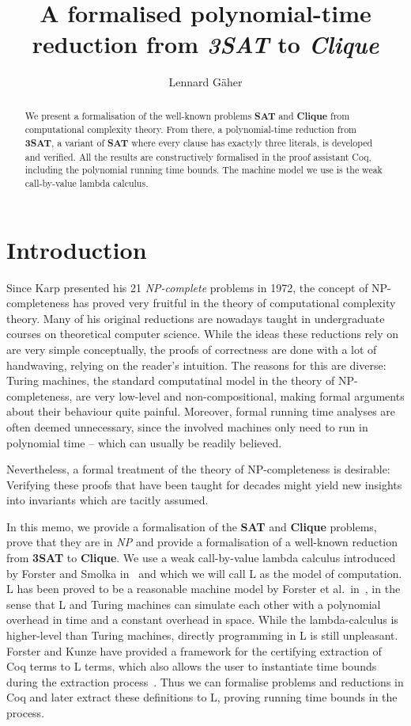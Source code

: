 \documentclass[a4paper,UKenglish,cleveref, autoref]{lipics-v2019}
\title{A formalised polynomial-time reduction from \emph{3SAT} to \emph{Clique}} %
\author{Lennard Gäher}{Saarland University, Germany}{s8legaeh@stud.uni-saarland.de}{}{}%
\begin{document}
\maketitle

\begin{abstract}
  We present a formalisation of the well-known problems \textbf{SAT} and \textbf{Clique} from computational complexity theory. From there, a polynomial-time reduction from \textbf{3SAT}, a variant of \textbf{SAT} where every clause has exactyly three literals, is developed and verified. 
  All the results are constructively formalised in the proof assistant Coq, including the polynomial running time bounds. The machine model we use is the weak call-by-value lambda calculus. 
\end{abstract}

\section{Introduction}
Since Karp presented his 21 \emph{NP-complete} problems in 1972, the concept of NP-completeness has proved very fruitful in the theory of computational complexity theory. Many of his original reductions are nowadays taught in undergraduate courses on theoretical computer science. 
While the ideas these reductions rely on are very simple conceptually, the proofs of correctness are done with a lot of handwaving, relying on the reader's intuition. The reasons for this are diverse: Turing machines, the standard computatinal model in the theory of NP-completeness, are very low-level and non-compositional, making formal arguments about their behaviour quite painful. Moreover, formal running time analyses are often deemed unnecessary, since the involved machines only need to run in polynomial time -- which can usually be readily believed.

Nevertheless, a formal treatment of the theory of NP-completeness is desirable: Verifying these proofs that have been taught for decades might yield new insights into invariants which are tacitly assumed.

In this memo, we provide a formalisation of the \textbf{SAT} and \textbf{Clique} problems, prove that they are in \emph{NP} and provide a formalisation of a well-known reduction from \textbf{3SAT} to \textbf{Clique}. We use a weak call-by-value lambda calculus introduced by Forster and Smolka in~\cite{ForsterSmolka:2017:L-Computability} and which we will call L as the model of computation. L has been proved to be a reasonable machine model by Forster et al.\ in~\cite{ForsterKunzeRoth:2019:wcbv-Reasonable}, in the sense that L and Turing machines can simulate each other with a polynomial overhead in time and a constant overhead in space. 
While the lambda-calculus is higher-level than Turing machines, directly programming in L is still unpleasant. Forster and Kunze have provided a framework for the certifying extraction of Coq terms to L terms, which also allows the user to instantiate time bounds during the extraction process~\cite{ForsterKunze:2019:Certifying-extraction}. Thus we can formalise problems and reductions in Coq and later extract these definitions to L, proving running time bounds in the process.
\end{document}
